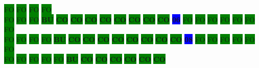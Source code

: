 \colorbox{green}{\color[gray]{0.75}FO}%
\colorbox{green}{\color[gray]{0.75}FO}%
\colorbox{green}{\color[gray]{0.75}FO}%
\colorbox{green}{\color[gray]{0.75}FO}%
\\
\colorbox{green}{\color[gray]{0.75}FO}%
\colorbox{green}{\color[gray]{0.75}FO}%
\colorbox{green}{\color[gray]{0.75}FO}%
\colorbox{green}{\color[rgb]{1,0,0}\textbf{BU}}%
\colorbox{green}{\color[rgb]{0,0,0}\textbf{CO}}%
\colorbox{green}{\color[rgb]{0,0,0}\textbf{CO}}%
\colorbox{green}{\color[rgb]{0,0,0}\textbf{CO}}%
\colorbox{green}{\color[rgb]{0,0,0}\textbf{CO}}%
\colorbox{green}{\color[rgb]{0,0,0}\textbf{CO}}%
\colorbox{green}{\color[rgb]{0,0,0}\textbf{CO}}%
\colorbox{green}{\color[rgb]{0,0,0}\textbf{CO}}%
\colorbox{green}{\color[rgb]{0,0,0}\textbf{CO}}%
\colorbox{blue}{\color[rgb]{1,0,0}\textbf{06}}%
\colorbox{green}{\color[gray]{0.75}FO}%
\colorbox{green}{\color[gray]{0.75}FO}%
\colorbox{green}{\color[gray]{0.75}FO}%
\colorbox{green}{\color[gray]{0.75}FO}%
\colorbox{green}{\color[gray]{0.75}FO}%
\colorbox{green}{\color[gray]{0.75}FO}%
\colorbox{green}{\color[gray]{0.75}FO}%
\\
\colorbox{green}{\color[gray]{0.75}FO}%
\colorbox{green}{\color[gray]{0.75}FO}%
\colorbox{green}{\color[gray]{0.75}FO}%
\colorbox{green}{\color[gray]{0.75}FO}%
\colorbox{green}{\color[rgb]{1,0,0}\textbf{BU}}%
\colorbox{green}{\color[rgb]{0,0,0}\textbf{CO}}%
\colorbox{green}{\color[rgb]{0,0,0}\textbf{CO}}%
\colorbox{green}{\color[rgb]{0,0,0}\textbf{CO}}%
\colorbox{green}{\color[rgb]{0,0,0}\textbf{CO}}%
\colorbox{green}{\color[rgb]{0,0,0}\textbf{CO}}%
\colorbox{green}{\color[rgb]{0,0,0}\textbf{CO}}%
\colorbox{green}{\color[rgb]{0,0,0}\textbf{CO}}%
\colorbox{green}{\color[rgb]{0,0,0}\textbf{CO}}%
\colorbox{blue}{\color[rgb]{1,0,0}\textbf{08}}%
\colorbox{green}{\color[gray]{0.75}FO}%
\colorbox{green}{\color[gray]{0.75}FO}%
\colorbox{green}{\color[gray]{0.75}FO}%
\colorbox{green}{\color[gray]{0.75}FO}%
\colorbox{green}{\color[gray]{0.75}FO}%
\colorbox{green}{\color[gray]{0.75}FO}%
\\
\colorbox{green}{\color[gray]{0.75}FO}%
\colorbox{green}{\color[gray]{0.75}FO}%
\colorbox{green}{\color[gray]{0.75}FO}%
\colorbox{green}{\color[gray]{0.75}FO}%
\colorbox{green}{\color[gray]{0.75}FO}%
\colorbox{green}{\color[rgb]{1,0,0}\textbf{BU}}%
\colorbox{green}{\color[rgb]{0,0,0}\textbf{CO}}%
\colorbox{green}{\color[rgb]{0,0,0}\textbf{CO}}%
\colorbox{green}{\color[rgb]{0,0,0}\textbf{CO}}%
\colorbox{green}{\color[rgb]{0,0,0}\textbf{CO}}%
\colorbox{green}{\color[rgb]{0,0,0}\textbf{CO}}%
\colorbox{green}{\color[rgb]{0,0,0}\textbf{CO}}%
